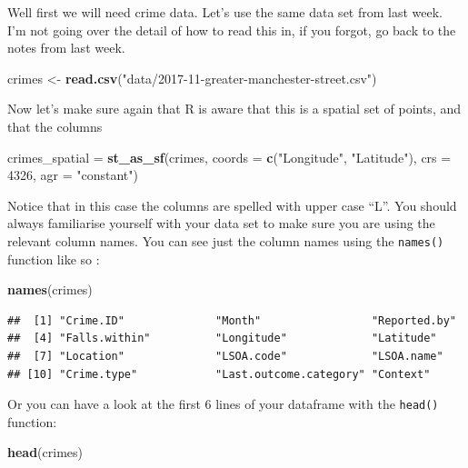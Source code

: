 \documentclass[]{book}
\newenvironment{Shaded}{\begin{snugshade}}{\end{snugshade}}
\newcommand{\DataTypeTok}[1]{\textcolor[rgb]{0.13,0.29,0.53}{#1}}
\newcommand{\DecValTok}[1]{\textcolor[rgb]{0.00,0.00,0.81}{#1}}
\newcommand{\KeywordTok}[1]{\textcolor[rgb]{0.13,0.29,0.53}{\textbf{#1}}}
\newcommand{\NormalTok}[1]{#1}
\newcommand{\StringTok}[1]{\textcolor[rgb]{0.31,0.60,0.02}{#1}}
\begin{document}
Well first we will need crime data. Let's use the same data set from last week. I'm not going over the detail of how to read this in, if you forgot, go back to the notes from last week.

\begin{Shaded}
\begin{Highlighting}[]
\NormalTok{crimes <-}\StringTok{ }\KeywordTok{read.csv}\NormalTok{(}\StringTok{"data/2017-11-greater-manchester-street.csv"}\NormalTok{)}
\end{Highlighting}
\end{Shaded}

Now let's make sure again that R is aware that this is a spatial set of points, and that the columns

\begin{Shaded}
\begin{Highlighting}[]
\NormalTok{crimes_spatial =}\StringTok{ }\KeywordTok{st_as_sf}\NormalTok{(crimes, }\DataTypeTok{coords =} \KeywordTok{c}\NormalTok{(}\StringTok{"Longitude"}\NormalTok{, }\StringTok{"Latitude"}\NormalTok{), }
                 \DataTypeTok{crs =} \DecValTok{4326}\NormalTok{, }\DataTypeTok{agr =} \StringTok{"constant"}\NormalTok{)}
\end{Highlighting}
\end{Shaded}

Notice that in this case the columns are spelled with upper case ``L''. You should always familiarise yourself with your data set to make sure you are using the relevant column names. You can see just the column names using the \texttt{names()} function like so :

\begin{Shaded}
\begin{Highlighting}[]
\KeywordTok{names}\NormalTok{(crimes)}
\end{Highlighting}
\end{Shaded}

\begin{verbatim}
##  [1] "Crime.ID"              "Month"                 "Reported.by"          
##  [4] "Falls.within"          "Longitude"             "Latitude"             
##  [7] "Location"              "LSOA.code"             "LSOA.name"            
## [10] "Crime.type"            "Last.outcome.category" "Context"
\end{verbatim}

Or you can have a look at the first 6 lines of your dataframe with the \texttt{head()} function:

\begin{Shaded}
\begin{Highlighting}[]
\KeywordTok{head}\NormalTok{(crimes)}
\end{Highlighting}
\end{Shaded}
\end{document}
